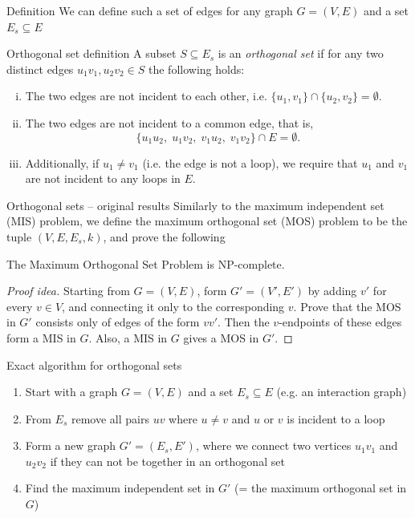 \documentclass{beamer}
\theoremstyle{plain}
\theoremstyle{remark}
\begin{document}
\begin{frame}{Definition}
	We can define such a set of edges for any graph $G=(V, E)$ and a set $E_s \subseteq E$
	\begin{block}{Orthogonal set definition}
		A subset $S \subseteq E_s$ is an \emph{orthogonal set} if for any two distinct edges $u_1v_1, u_2v_2 \in S$ the following holds:
		\begin{enumerate}[i)]
			\item The two edges are not incident to each other, i.e. $\{u_1,v_1\} \cap \{u_2, v_2\} = \emptyset.$
			\item The two edges are not incident to a common edge, that is, \[\{u_1u_2,\; u_1v_2,\; v_1u_2,\; v_1v_2\} \cap E = \emptyset.\]
			\item Additionally, if $u_1 \neq v_1$ (i.e. the edge is not a loop), we require that $u_1$ and $v_1$ are not incident to any loops in $E$. 
		\end{enumerate}
	\end{block}
\end{frame}

\begin{frame}{Orthogonal sets -- original results \cite{brodnik2016construction}}
	Similarly to the maximum independent set (MIS) problem, we define the maximum orthogonal set (MOS) problem to be the tuple $(V, E, E_s, k)$, and prove the following
	\begin{theorem}
		The Maximum Orthogonal Set Problem is NP-complete.
	\end{theorem}
	\begin{proof}[Proof idea]
		Starting from $G=(V, E)$, form $G'=(V', E')$ by adding $v'$ for every $v \in V$, and connecting it only to the corresponding $v$. Prove that the MOS in $G'$ consists only of edges of the form $vv'$. Then the $v$-endpoints of these edges form a MIS in $G$. Also, a MIS in $G$ gives a MOS in $G'$.
	\end{proof}
\end{frame}

\begin{frame}{Exact algorithm for orthogonal sets}
\begin{enumerate}
	\item Start with a graph $G = (V, E)$ and a set $E_s \subseteq E$ (e.g. an interaction graph)
	\item From $E_s$ remove all pairs $uv$ where $u \neq v$ and $u$ or $v$ is incident to a loop
	\item Form a new graph $G' = (E_s, E')$, where we connect two vertices $u_1v_1$ and $u_2v_2$ if they can not be together in an orthogonal set
	\item Find the maximum independent set in $G'$ (= the maximum orthogonal set in $G$)
\end{enumerate}
\end{frame}
\end{document}
